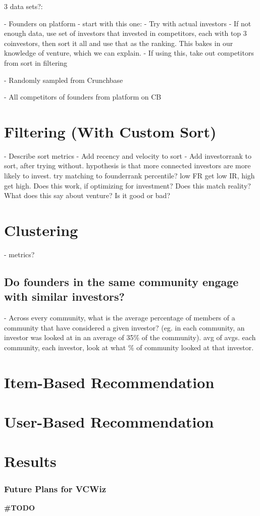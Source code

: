 3 data sets?:

- Founders on platform - start with this one:
  - Try with actual investors
  - If not enough data, use set of investors that invested in competitors, each with top 3 coinvestors, then sort it all and use that as the ranking. This bakes in our knowledge of venture, which we can explain.
  - If using this, take out competitors from sort in filtering

- Randomly sampled from Crunchbase

- All competitors of founders from platform on CB

\section{Filtering (With Custom Sort)}

- Describe sort metrics
- Add recency and velocity to sort
- Add investorrank to sort, after trying without. hypothesis is that more connected investors are more likely to invest. try matching to founderrank percentile? low FR get low IR, high get high. Does this work, if optimizing for investment? Does this match reality? What does this say about venture? Is it good or bad?

\section{Clustering}

- metrics?

\subsection{Do founders in the same community engage with similar investors?}

- Across every community, what is the average percentage of members of a community that have considered a given investor? (eg. in each community, an investor was looked at in an average of 35\% of the community). avg of avgs. each community, each investor, look at what \% of community looked at that investor.

\section{Item-Based Recommendation}

\section{User-Based Recommendation}

\section{Results}


\subsubsection{Future Plans for VCWiz}

\textbf{\#TODO}
